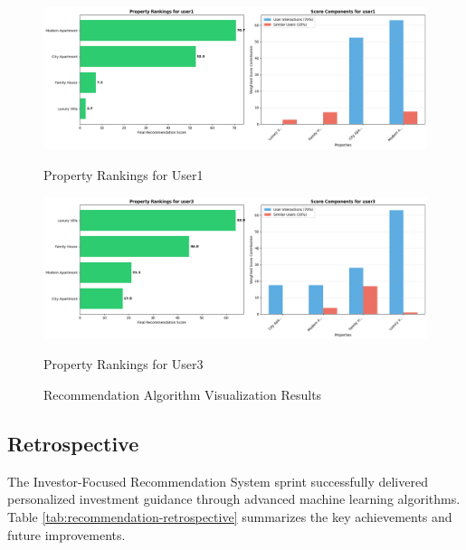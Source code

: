 \newpage
\begin{figure}[htbp]
    \centering
    \begin{minipage}{0.8\textwidth}
        \centering
        \includegraphics[width=\linewidth]{images/recommendation_user1_rankings.png}
        \caption*{Property Rankings for User1}
    \end{minipage}
    
    \begin{minipage}{0.8\textwidth}
        \centering
        \includegraphics[width=\linewidth]{images/recommendation_user3_rankings.png}
        \caption*{Property Rankings for User3}
    \end{minipage}
    
    \caption{Recommendation Algorithm Visualization Results}
    \label{fig:recommendation-visualization}
\end{figure}

\subsection{Retrospective}

The Investor-Focused Recommendation System sprint successfully delivered personalized investment guidance through advanced machine learning algorithms. Table \ref{tab:recommendation-retrospective} summarizes the key achievements and future improvements.


